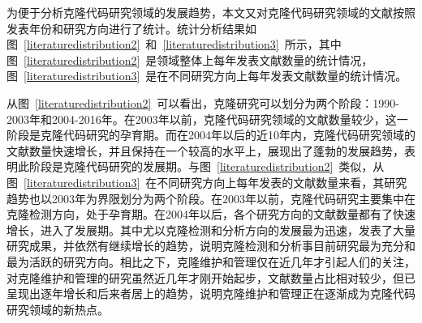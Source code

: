 为便于分析克隆代码研究领域的发展趋势，本文又对克隆代码研究领域的文献按照发表年份和研究方向进行了统计。统计分析结果如图~\ref{literaturedistribution2}~和~\ref{literaturedistribution3}~所示，其中图~\ref{literaturedistribution2}~是领域整体上每年发表文献数量的统计情况，图~\ref{literaturedistribution3}~是在不同研究方向上每年发表文献数量的统计情况。

从图~\ref{literaturedistribution2}~可以看出，克隆研究可以划分为两个阶段：1990-2003年和2004-2016年。在2003年以前，克隆代码研究领域的文献数量较少，这一阶段是克隆代码研究的孕育期。而在2004年以后的近10年内，克隆代码研究领域的文献数量快速增长，并且保持在一个较高的水平上，展现出了蓬勃的发展趋势，表明此阶段是克隆代码研究的发展期。与图~\ref{literaturedistribution2}~类似，从图~\ref{literaturedistribution3}~在不同研究方向上每年发表的文献数量来看，其研究趋势也以2003年为界限划分为两个阶段。在2003年以前，克隆代码研究主要集中在克隆检测方向，处于孕育期。在2004年以后，各个研究方向的文献数量都有了快速增长，进入了发展期。其中尤以克隆检测和分析方向的发展最为迅速，发表了大量研究成果，并依然有继续增长的趋势，说明克隆检测和分析事目前研究最为充分和最为活跃的研究方向。相比之下，克隆维护和管理仅在近几年才引起人们的关注，对克隆维护和管理的研究虽然近几年才刚开始起步，文献数量占比相对较少，但已呈现出逐年增长和后来者居上的趋势，说明克隆维护和管理正在逐渐成为克隆代码研究领域的新热点。


